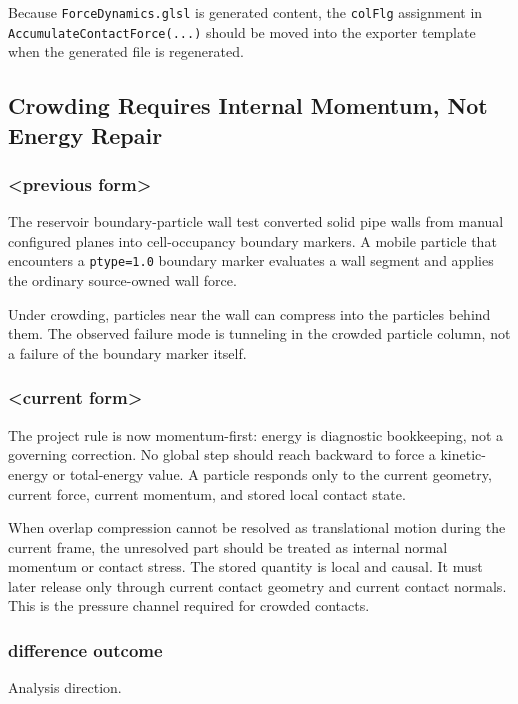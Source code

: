 Because \texttt{ForceDynamics.glsl} is generated content, the
\texttt{colFlg} assignment in \texttt{AccumulateContactForce(...)} should be
moved into the exporter template when the generated file is regenerated.

\subsection{Crowding Requires Internal Momentum, Not Energy Repair}

\subsubsection{<previous form>}

The reservoir boundary-particle wall test converted solid pipe walls from
manual configured planes into cell-occupancy boundary markers.  A mobile
particle that encounters a \texttt{ptype=1.0} boundary marker evaluates a wall
segment and applies the ordinary source-owned wall force.

Under crowding, particles near the wall can compress into the particles behind
them.  The observed failure mode is tunneling in the crowded particle column,
not a failure of the boundary marker itself.

\subsubsection{<current form>}

The project rule is now momentum-first: energy is diagnostic bookkeeping, not
a governing correction.  No global step should reach backward to force a
kinetic-energy or total-energy value.  A particle responds only to the current
geometry, current force, current momentum, and stored local contact state.

When overlap compression cannot be resolved as translational motion during the
current frame, the unresolved part should be treated as internal normal
momentum or contact stress.  The stored quantity is local and causal.  It must
later release only through current contact geometry and current contact
normals.  This is the pressure channel required for crowded contacts.

\subsubsection{difference outcome}

Analysis direction.

